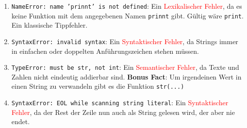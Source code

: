 \begin{enumerate}
    \item \texttt{NameError: name 'prinnt' is not defined}: Ein \textcolor{red}{Lexikalischer Fehler}, da es keine Funktion mit dem angegebenen Namen
        \texttt	{prinnt} gibt. Gültig wäre \texttt{print}. Ein klassische Tippfehler.
    \item \texttt{SyntaxError: invalid syntax}: Ein \textcolor{red}{Syntaktischer Fehler}, da Strings immer in einfachen oder doppelten Anführungszeichen
        stehen müssen.
    \item \texttt{TypeError: must be str, not int}: Ein \textcolor{red}{Semantischer Fehler}, da Texte und Zahlen nicht eindeutig addierbar sind.
        \textbf{Bonus Fact}: Um irgendeinen Wert in einen String zu verwandeln gibt es die Funktion \texttt{str(...)}
    \item \texttt{SyntaxError: EOL while scanning string literal}: Ein \textcolor{red}{Syntaktischer Fehler}, da der Rest der Zeile nun auch als String
        gelesen wird, der aber nie endet.
\end{enumerate}
